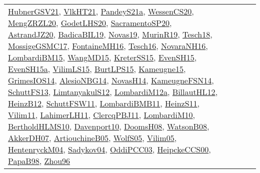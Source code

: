 {\begin{longtable}{lp{3cm}>{\raggedright}p{6cm}>{\raggedright}p{6cm}p{8cm}}
\href{articles/HubnerGSV21.pdf}{HubnerGSV21}\cite{HubnerGSV21}, \href{articles/VlkHT21.pdf}{VlkHT21}\cite{VlkHT21}, \href{articles/PandeyS21a.pdf}{PandeyS21a}\cite{PandeyS21a}, \href{papers/WessenCS20.pdf}{WessenCS20}\cite{WessenCS20}, \href{articles/MengZRZL20.pdf}{MengZRZL20}\cite{MengZRZL20}, \href{papers/GodetLHS20.pdf}{GodetLHS20}\cite{GodetLHS20}, \href{articles/SacramentoSP20.pdf}{SacramentoSP20}\cite{SacramentoSP20}, \href{articles/AstrandJZ20.pdf}{AstrandJZ20}\cite{AstrandJZ20}, \href{papers/BadicaBIL19.pdf}{BadicaBIL19}\cite{BadicaBIL19}, \href{articles/Novas19.pdf}{Novas19}\cite{Novas19}, \href{papers/MurinR19.pdf}{MurinR19}\cite{MurinR19}, \href{papers/Tesch18.pdf}{Tesch18}\cite{Tesch18}, \href{papers/MossigeGSMC17.pdf}{MossigeGSMC17}\cite{MossigeGSMC17}, \href{papers/FontaineMH16.pdf}{FontaineMH16}\cite{FontaineMH16}, \href{papers/Tesch16.pdf}{Tesch16}\cite{Tesch16}, \href{articles/NovaraNH16.pdf}{NovaraNH16}\cite{NovaraNH16}, \href{papers/LombardiBM15.pdf}{LombardiBM15}\cite{LombardiBM15}, \href{articles/WangMD15.pdf}{WangMD15}\cite{WangMD15}, \href{papers/KreterSS15.pdf}{KreterSS15}\cite{KreterSS15}, \href{papers/EvenSH15.pdf}{EvenSH15}\cite{EvenSH15}, \href{articles/EvenSH15a.pdf}{EvenSH15a}\cite{EvenSH15a}, \href{papers/VilimLS15.pdf}{VilimLS15}\cite{VilimLS15}, \href{papers/BurtLPS15.pdf}{BurtLPS15}\cite{BurtLPS15}, \href{articles/Kameugne15.pdf}{Kameugne15}\cite{Kameugne15}, \href{articles/GrimesIOS14.pdf}{GrimesIOS14}\cite{GrimesIOS14}, \href{papers/AlesioNBG14.pdf}{AlesioNBG14}\cite{AlesioNBG14}, \href{articles/NovasH14.pdf}{NovasH14}\cite{NovasH14}, \href{articles/KameugneFSN14.pdf}{KameugneFSN14}\cite{KameugneFSN14}, \href{papers/SchuttFS13.pdf}{SchuttFS13}\cite{SchuttFS13}, \href{articles/LimtanyakulS12.pdf}{LimtanyakulS12}\cite{LimtanyakulS12}, \href{articles/LombardiM12a.pdf}{LombardiM12a}\cite{LombardiM12a}, \href{papers/BillautHL12.pdf}{BillautHL12}\cite{BillautHL12}, \href{papers/HeinzB12.pdf}{HeinzB12}\cite{HeinzB12}, \href{articles/SchuttFSW11.pdf}{SchuttFSW11}\cite{SchuttFSW11}, \href{papers/LombardiBMB11.pdf}{LombardiBMB11}\cite{LombardiBMB11}, \href{papers/HeinzS11.pdf}{HeinzS11}\cite{HeinzS11}, \href{papers/Vilim11.pdf}{Vilim11}\cite{Vilim11}, \href{papers/LahimerLH11.pdf}{LahimerLH11}\cite{LahimerLH11}, \href{papers/ClercqPBJ11.pdf}{ClercqPBJ11}\cite{ClercqPBJ11}, \href{papers/LombardiM10.pdf}{LombardiM10}\cite{LombardiM10}, \href{papers/BertholdHLMS10.pdf}{BertholdHLMS10}\cite{BertholdHLMS10}, \href{papers/Davenport10.pdf}{Davenport10}\cite{Davenport10}, \href{papers/DoomsH08.pdf}{DoomsH08}\cite{DoomsH08}, \href{papers/WatsonB08.pdf}{WatsonB08}\cite{WatsonB08}, \href{papers/AkkerDH07.pdf}{AkkerDH07}\cite{AkkerDH07}, \href{papers/ArtiouchineB05.pdf}{ArtiouchineB05}\cite{ArtiouchineB05}, \href{papers/WolfS05.pdf}{WolfS05}\cite{WolfS05}, \href{papers/Vilim05.pdf}{Vilim05}\cite{Vilim05}, \href{papers/HentenryckM04.pdf}{HentenryckM04}\cite{HentenryckM04}, \href{papers/Sadykov04.pdf}{Sadykov04}\cite{Sadykov04}, \href{papers/OddiPCC03.pdf}{OddiPCC03}\cite{OddiPCC03}, \href{articles/HeipckeCCS00.pdf}{HeipckeCCS00}\cite{HeipckeCCS00}, \href{articles/PapaB98.pdf}{PapaB98}\cite{PapaB98}, \href{papers/Zhou96.pdf}{Zhou96}\cite{Zhou96}\\

\end{longtable}}
